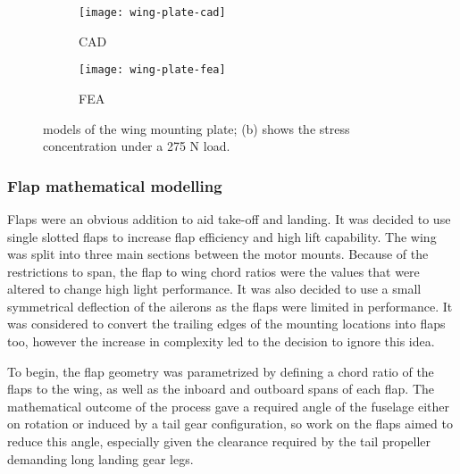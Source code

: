 \documentclass[../../main.tex]{subfiles}
\begin{document}

\begin{figure}[H]

    \centering
    \begin{subfigure}[b]{0.49\columnwidth}
        \centering
        \texttt{[image: wing-plate-cad]}
        \caption{CAD}
        \label{fig:wing-plate:cad}
    \end{subfigure}
    \hfill
    \begin{subfigure}[b]{0.49\columnwidth}
        \centering
        \texttt{[image: wing-plate-fea]}
        \caption{FEA}
        \label{fig:wing-plate:fea}
    \end{subfigure}
    
    \caption{
        models of the wing mounting plate; (b) shows the stress concentration under a 275 N load.
    }
    \label{fig:wing-plate}
\end{figure}

\subsubsection{Flap mathematical modelling} \label{sec:design-process:final-design-proposal:wing:flap-mathematical-modelling}

Flaps were an obvious addition to aid take-off and landing.
It was decided to use single slotted flaps to increase flap efficiency and high lift capability.
The wing was split into three main sections between the motor mounts.
Because of the restrictions to span, the flap to wing chord ratios were the values that were altered to change high light performance.
It was also decided to use a small symmetrical deflection of the ailerons as the flaps were limited in performance.
It was considered to convert the trailing edges of the mounting locations into flaps too, however the increase in complexity led to the decision to ignore this idea. 

To begin, the flap geometry was parametrized by defining a chord ratio of the flaps to the wing, as well as the inboard and outboard spans of each flap.
The mathematical outcome of the process gave a required angle of the fuselage either on rotation or induced by a tail gear configuration, so work on the flaps aimed to reduce this angle, especially given the clearance required by the tail propeller demanding long landing gear legs. 
\end{document}
